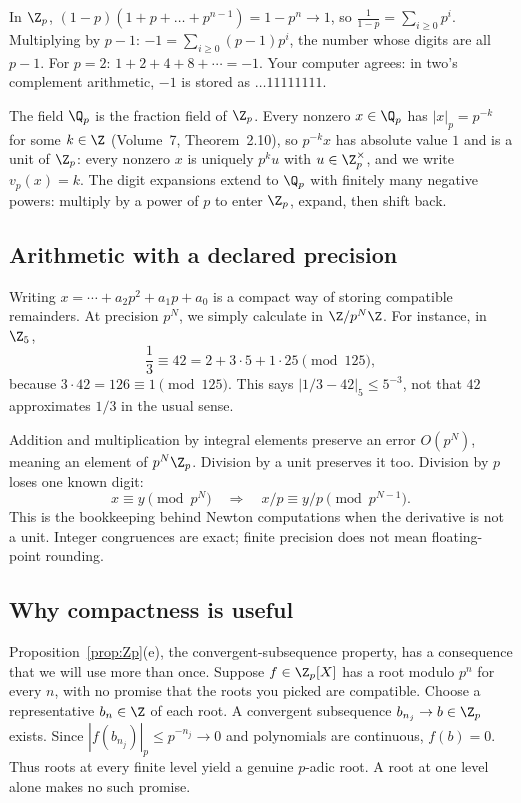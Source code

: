 \begin{example}
In $\Z_p$, $(1-p)(1+p+\dots+p^{n-1})=1-p^n\to1$, so $\displaystyle\frac1{1-p}=\sum_{i\ge0}p^i$. Multiplying by $p-1$:
$-1=\sum_{i\ge0}(p-1)p^i$, the number whose digits are all $p-1$. For $p=2$: $1+2+4+8+\cdots=-1$. Your computer agrees: in
two's complement arithmetic, $-1$ is stored as $\dots11111111$.
\end{example}

The field $\Q_p$ is the fraction field of $\Z_p$. Every nonzero $x\in\Q_p$ has $|x|_p=p^{-k}$ for some $k\in\Z$ (Volume~7,
Theorem~2.10), so $p^{-k}x$ has absolute value $1$ and is a unit of $\Z_p$: every nonzero $x$ is uniquely $p^ku$ with
$u\in\Z_p^\times$, and we write $v_p(x)=k$. The digit expansions extend to $\Q_p$ with finitely many negative powers: multiply by
a power of $p$ to enter $\Z_p$, expand, then shift back.

\subsection*{Arithmetic with a declared precision}
Writing $x=\cdots+a_2p^2+a_1p+a_0$ is a compact way of storing compatible
remainders. At precision $p^N$, we simply calculate in $\Z/p^N\Z$.
For instance, in $\Z_5$,
\[
\frac13\equiv42=2+3\cdot5+1\cdot25\pmod{125},
\]
because $3\cdot42=126\equiv1\pmod{125}$. This says
$|1/3-42|_5\le5^{-3}$, not that $42$ approximates $1/3$ in the usual sense.

Addition and multiplication by integral elements preserve an error
$O(p^N)$, meaning an element of $p^N\Z_p$. Division by a unit preserves it too.
Division by $p$ loses one known digit:
\[
x\equiv y\pmod{p^N}\quad\Longrightarrow\quad
x/p\equiv y/p\pmod{p^{N-1}}.
\]
This is the bookkeeping behind Newton computations when the derivative is
not a unit. Integer congruences are exact; finite precision does not mean
floating-point rounding.

\subsection*{Why compactness is useful}
Proposition~\ref{prop:Zp}(e), the convergent-subsequence property, has a consequence that we will use more than once.
Suppose $f\in\Z_p[X]$ has a root modulo $p^n$ for every $n$, with no promise
that the roots you picked are compatible. Choose a representative $b_n\in\Z$
of each root. A convergent subsequence $b_{n_j}\to b\in\Z_p$ exists. Since
$|f(b_{n_j})|_p\le p^{-n_j}\to0$ and polynomials are continuous, $f(b)=0$.
Thus roots at every finite level yield a genuine $p$-adic root. A root at
one level alone makes no such promise.

